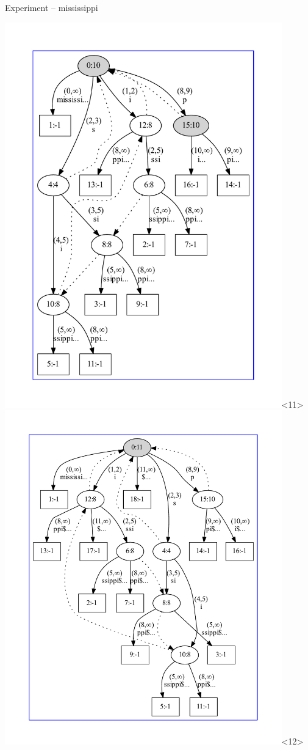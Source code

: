 \begin{frame}{Experiment -- mississippi}
\begin{overlayarea}{\textwidth}{\textheight}
\includegraphics[keepaspectratio,height=0.9\textheight,width=0.9\textwidth]{mississippi.pdf}<11>
\includegraphics[keepaspectratio,height=0.9\textheight,width=0.9\textwidth]{mississippi_.pdf}<12>
\end{overlayarea}
\end{frame}
